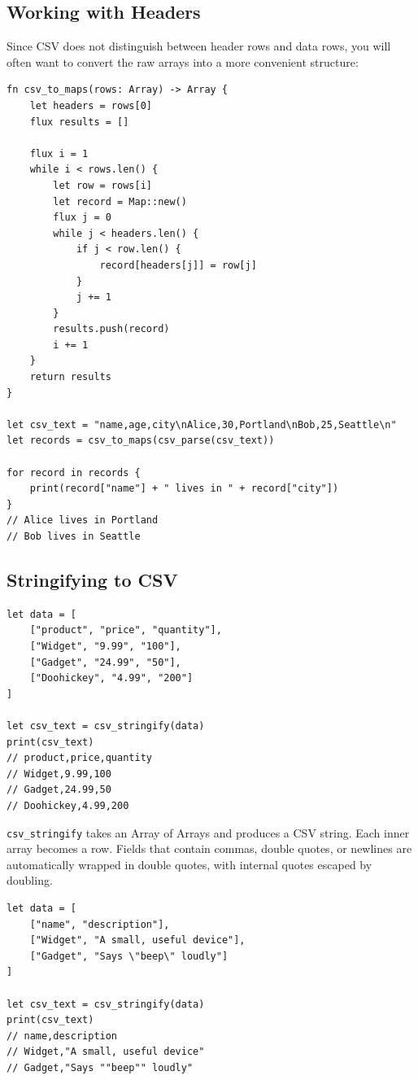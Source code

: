 \subsection{Working with Headers}

Since CSV does not distinguish between header rows and data rows, you will
often want to convert the raw arrays into a more convenient structure:

\begin{lstlisting}[language=Lattice, caption={Converting CSV rows to maps}]
fn csv_to_maps(rows: Array) -> Array {
    let headers = rows[0]
    flux results = []

    flux i = 1
    while i < rows.len() {
        let row = rows[i]
        let record = Map::new()
        flux j = 0
        while j < headers.len() {
            if j < row.len() {
                record[headers[j]] = row[j]
            }
            j += 1
        }
        results.push(record)
        i += 1
    }
    return results
}

let csv_text = "name,age,city\nAlice,30,Portland\nBob,25,Seattle\n"
let records = csv_to_maps(csv_parse(csv_text))

for record in records {
    print(record["name"] + " lives in " + record["city"])
}
// Alice lives in Portland
// Bob lives in Seattle
\end{lstlisting}

\subsection{Stringifying to CSV}

\begin{lstlisting}[language=Lattice, caption={Generating CSV output}]
let data = [
    ["product", "price", "quantity"],
    ["Widget", "9.99", "100"],
    ["Gadget", "24.99", "50"],
    ["Doohickey", "4.99", "200"]
]

let csv_text = csv_stringify(data)
print(csv_text)
// product,price,quantity
// Widget,9.99,100
// Gadget,24.99,50
// Doohickey,4.99,200
\end{lstlisting}

\lstinline|csv_stringify| takes an Array of Arrays and produces a CSV string.
Each inner array becomes a row. Fields that contain commas, double quotes, or
newlines are automatically wrapped in double quotes, with internal quotes
escaped by doubling.

\begin{lstlisting}[language=Lattice, caption={CSV auto-quoting of special characters}]
let data = [
    ["name", "description"],
    ["Widget", "A small, useful device"],
    ["Gadget", "Says \"beep\" loudly"]
]

let csv_text = csv_stringify(data)
print(csv_text)
// name,description
// Widget,"A small, useful device"
// Gadget,"Says ""beep"" loudly"
\end{lstlisting}

